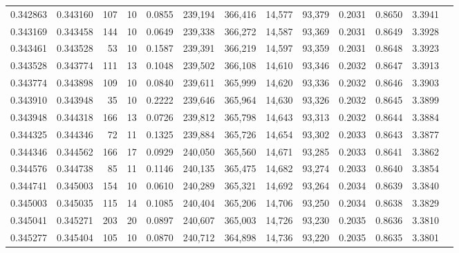 \begin{tabular}{rrrrrrrrrrrrr}
0.342863 & 0.343160 &   107 &  10 &                                     0.0855 & 239,194 & 366,416 &  14,577 &  93,379 & 0.2031 & 0.8650 & 3.3941 \\
0.343169 & 0.343458 &   144 &  10 &                                     0.0649 & 239,338 & 366,272 &  14,587 &  93,369 & 0.2031 & 0.8649 & 3.3928 \\
0.343461 & 0.343528 &    53 &  10 &                                     0.1587 & 239,391 & 366,219 &  14,597 &  93,359 & 0.2031 & 0.8648 & 3.3923 \\
0.343528 & 0.343774 &   111 &  13 &                                     0.1048 & 239,502 & 366,108 &  14,610 &  93,346 & 0.2032 & 0.8647 & 3.3913 \\
0.343774 & 0.343898 &   109 &  10 &                                     0.0840 & 239,611 & 365,999 &  14,620 &  93,336 & 0.2032 & 0.8646 & 3.3903 \\
0.343910 & 0.343948 &    35 &  10 &                                     0.2222 & 239,646 & 365,964 &  14,630 &  93,326 & 0.2032 & 0.8645 & 3.3899 \\
0.343948 & 0.344318 &   166 &  13 &                                     0.0726 & 239,812 & 365,798 &  14,643 &  93,313 & 0.2032 & 0.8644 & 3.3884 \\
0.344325 & 0.344346 &    72 &  11 &                                     0.1325 & 239,884 & 365,726 &  14,654 &  93,302 & 0.2033 & 0.8643 & 3.3877 \\
0.344346 & 0.344562 &   166 &  17 &                                     0.0929 & 240,050 & 365,560 &  14,671 &  93,285 & 0.2033 & 0.8641 & 3.3862 \\
0.344576 & 0.344738 &    85 &  11 &                                     0.1146 & 240,135 & 365,475 &  14,682 &  93,274 & 0.2033 & 0.8640 & 3.3854 \\
0.344741 & 0.345003 &   154 &  10 &                                     0.0610 & 240,289 & 365,321 &  14,692 &  93,264 & 0.2034 & 0.8639 & 3.3840 \\
0.345003 & 0.345035 &   115 &  14 &                                     0.1085 & 240,404 & 365,206 &  14,706 &  93,250 & 0.2034 & 0.8638 & 3.3829 \\
0.345041 & 0.345271 &   203 &  20 &                                     0.0897 & 240,607 & 365,003 &  14,726 &  93,230 & 0.2035 & 0.8636 & 3.3810 \\
0.345277 & 0.345404 &   105 &  10 &                                     0.0870 & 240,712 & 364,898 &  14,736 &  93,220 & 0.2035 & 0.8635 & 3.3801 \\

\end{tabular}
